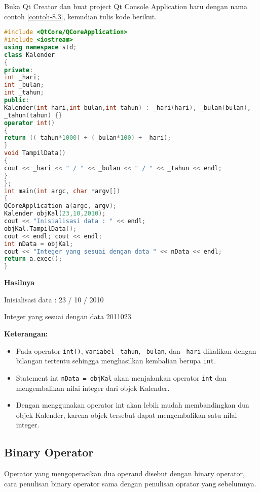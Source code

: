 Buka Qt Creator dan buat project Qt Console Application baru dengan nama
contoh \ref{contoh-8.3}, kemudian tulis kode berikut.

\begin{lstlisting}[language=c++, caption=Conversion Operator untuk konversi class Kalender ke integer, label=contoh-8.3]
#include <QtCore/QCoreApplication>
#include <iostream>
using namespace std;
class Kalender
{
private:
int _hari;
int _bulan;
int _tahun;
public:
Kalender(int hari,int bulan,int tahun) : _hari(hari), _bulan(bulan),
_tahun(tahun) {}
operator int()
{
return ((_tahun*1000) + (_bulan*100) + _hari);
}
void TampilData()
{
cout << _hari << " / " << _bulan << " / " << _tahun << endl;
}
};
int main(int argc, char *argv[])
{
QCoreApplication a(argc, argv);
Kalender objKal(23,10,2010);
cout << "Inisialisasi data : " << endl;
objKal.TampilData();
cout << endl; cout << endl;
int nData = objKal;
cout << "Integer yang sesuai dengan data " << nData << endl;
return a.exec();
}
\end{lstlisting}

\textbf{Hasilnya}
\begin{lcverbatim}
Inisialisasi data :
23 / 10 / 2010

Integer yang sesuai dengan data 2011023
\end{lcverbatim}


\textbf{Keterangan:}

\begin{itemize}
\tightlist
\item
  Pada operator \texttt{int()}, \texttt{variabel} \texttt{\_tahun},
  \texttt{\_bulan}, dan \texttt{\_hari} dikalikan dengan bilangan
  tertentu sehingga menghasilkan kembalian berupa \texttt{int}.
\item
  Statement int \texttt{nData\ =\ objKal} akan menjalankan operator
  \texttt{int} dan mengembalikan nilai integer dari objek Kalender.
\item
  Dengan menggunakan operator int akan lebih mudah membandingkan dua
  objek Kalender, karena objek tersebut dapat mengembalikan satu nilai
  integer.
\end{itemize}

\subsection{Binary Operator}\label{binary-operator}

Operator yang mengoperasikan dua operand disebut dengan binary operator,
cara penulisan binary operator sama dengan penulisan oprator yang
sebelumnya.


